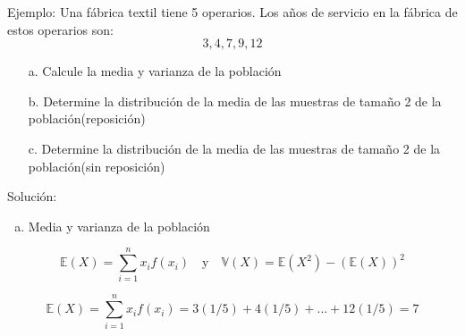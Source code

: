 \documentclass[
  ignorenonframetext,
]{beamer}
\providecommand{\tightlist}{%
  \setlength{\itemsep}{0pt}\setlength{\parskip}{0pt}}
\begin{document}
\begin{frame}{}

Ejemplo: \justifying Una fábrica textil tiene 5 operarios. Los años de
servicio en la fábrica de estos operarios son: \[3,4,7,9,12\]

\begin{itemize}
\justifying
  \item [a.] Calcule la media y varianza de la población
  \item [b.] Determine la distribución de la media de las muestras de tamaño 2 de la población(reposición)
  \item [c.] Determine la distribución de la media de las muestras de tamaño 2 de la población(sin reposición)
  
\end{itemize}

Solución:

\begin{enumerate}
[a.]
\tightlist
\item
  Media y varianza de la población
\end{enumerate}

\[\mathbb{E}(X)=\sum_{i=1}^{n} x_if(x_i) \quad\mbox{y} \quad \mathbb{V}(X)= \mathbb{E}(X^2)-(\mathbb{E}(X))^2\]

\[\mathbb{E}(X)=\sum_{i=1}^{n} x_if(x_i)=3(1/5)+4(1/5)+...+12(1/5)=7\]

\end{frame}

\hypertarget{section-4}{%
\subsection{}\label{section-4}}
\end{document}
